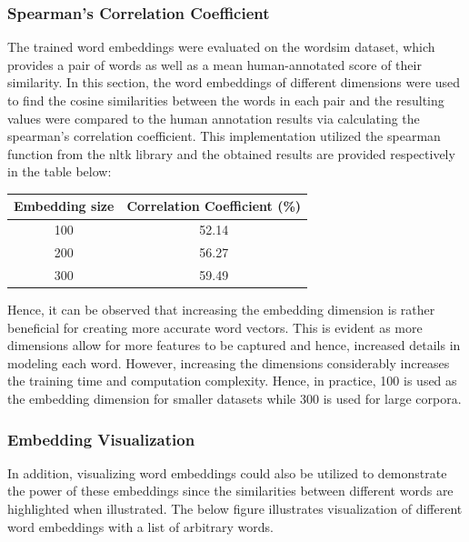 \documentclass[12pt,a4paper]{article}
\begin{document}
	\subsubsection{Spearman's Correlation Coefficient}
	The trained word embeddings were evaluated on the wordsim dataset, which provides a pair of words as well as a mean human-annotated score of their similarity. In this section, the word embeddings of different dimensions were used to find the cosine similarities between the words in each pair and the resulting values were compared to the human annotation results via calculating the spearman's correlation coefficient. This implementation utilized the spearman function from the nltk library and the obtained results are provided respectively in the table below:
	\begin{table}[H]
		\begin{center}
			\begin{tabular}{|c|c|}
				\hline
				Embedding size & Correlation Coefficient (\%)  \\ \hline
				100 &         52.14                \\ \hline
				200 &    56.27     \\ \hline
				300 &    59.49  \\ 
				\hline             
			\end{tabular}
		\end{center}
	\end{table}

\vspace{-0.6cm}
	\noindent Hence, it can be observed that increasing the embedding dimension is rather beneficial for creating more accurate word vectors. This is evident as more dimensions allow for more features to be captured and hence, increased details in modeling each word. However, increasing the dimensions considerably increases the training time and computation complexity. Hence, in practice, 100 is used as the embedding dimension for smaller datasets while 300 is used for large corpora.

	
	\subsubsection{Embedding Visualization}
	In addition, visualizing word embeddings could also be utilized to demonstrate the power of these embeddings since the similarities between different words are highlighted when illustrated. The below figure illustrates visualization of different word embeddings with a list of arbitrary words.
	
\end{document}
